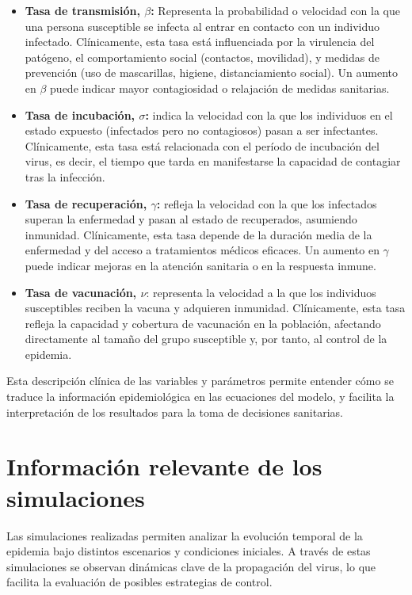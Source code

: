 \begin{itemize}
    \item \textbf{Tasa de transmisión, $\beta$:} Representa la probabilidad o velocidad con la que una persona susceptible se infecta al entrar en contacto con un individuo infectado. Clínicamente, esta tasa está influenciada por la virulencia del patógeno, el comportamiento social (contactos, movilidad), y medidas de prevención (uso de mascarillas, higiene, distanciamiento social). Un aumento en $\beta$ puede indicar mayor contagiosidad o relajación de medidas sanitarias.
    \item \textbf{Tasa de incubación, $\sigma$:} indica la velocidad con la que los individuos en el estado expuesto (infectados pero no contagiosos) pasan a ser infectantes. Clínicamente, esta tasa está relacionada con el período de incubación del virus, es decir, el tiempo que tarda en manifestarse la capacidad de contagiar tras la infección.
    \item \textbf{Tasa de recuperación, $\gamma$:} refleja la velocidad con la que los infectados superan la enfermedad y pasan al estado de recuperados, asumiendo inmunidad. Clínicamente, esta tasa depende de la duración media de la enfermedad y del acceso a tratamientos médicos eficaces. Un aumento en $\gamma$ puede indicar mejoras en la atención sanitaria o en la respuesta inmune.
    \item \textbf{Tasa de vacunación, $\nu$}: representa la velocidad a la que los individuos susceptibles reciben la vacuna y adquieren inmunidad. Clínicamente, esta tasa refleja la capacidad y cobertura de vacunación en la población, afectando directamente al tamaño del grupo susceptible y, por tanto, al control de la epidemia.
    
\end{itemize}

Esta descripción clínica de las variables y parámetros permite entender cómo se traduce la información epidemiológica en las ecuaciones del modelo, y facilita la interpretación de los resultados para la toma de decisiones sanitarias.


\section{Información relevante de los simulaciones}

Las simulaciones realizadas permiten analizar la evolución temporal de la epidemia bajo distintos escenarios y condiciones iniciales. A través de estas simulaciones se observan dinámicas clave de la propagación del virus, lo que facilita la evaluación de posibles estrategias de control.

